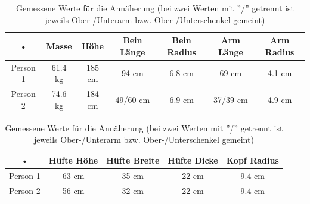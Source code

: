 \begin{table}
\begin{center}
\begin{tabular}{|c|c|c|c|c|c|c|}
\hline 
• & Masse & Höhe & Bein Länge & Bein Radius & Arm Länge & Arm Radius \\
\hline 
Person 1 & 61.4 kg & 185 cm & 94 cm & 6.8 cm & 69 cm & 4.1 cm \\
\hline 
Person 2 & 74.6 kg & 184 cm & 49/60 cm & 6.9 cm & 37/39 cm & 4.9 cm \\
\hline
\end{tabular}
\end{center}

\begin{center}
\begin{tabular}{|c|c|c|c|c|}
\hline
• & Hüfte Höhe & Hüfte Breite & Hüfte Dicke & Kopf Radius \\
\hline
Person 1 & 63 cm & 35 cm & 22 cm & 9.4 cm \\
\hline
Person 2 & 56 cm & 32 cm & 22 cm & 9.4 cm \\ 
\hline
\end{tabular}
\caption{Gemessene Werte für die Annäherung (bei zwei Werten mit ''/'' getrennt ist jeweils Ober-/Unterarm bzw. Ober-/Unterschenkel gemeint)}
\end{center}

\end{table}
